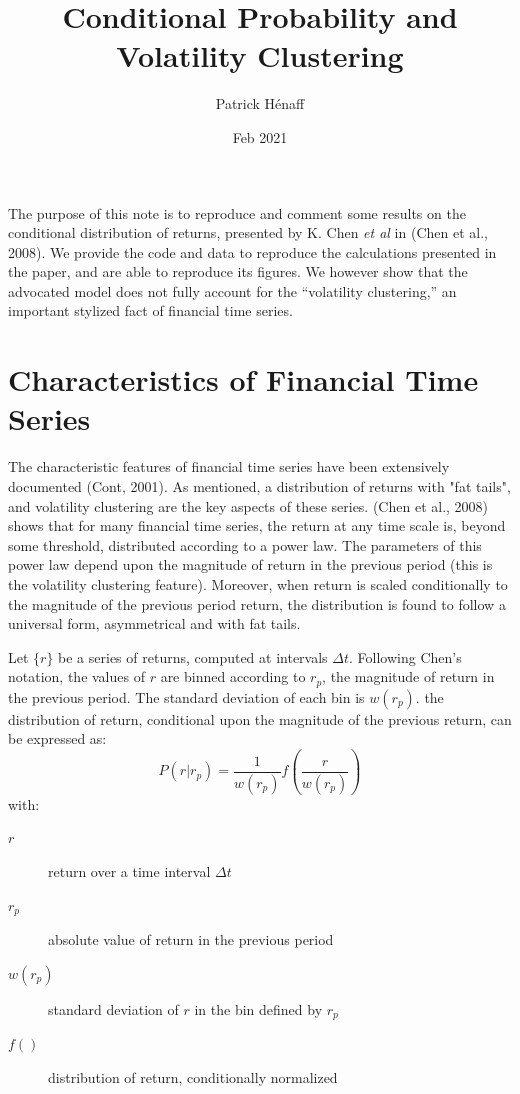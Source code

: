 \documentclass[
  11pt,
]{article}
\title{Conditional Probability and Volatility Clustering}
\author{Patrick Hénaff}
\date{Feb 2021}
\begin{document}
\maketitle

The purpose of this note is to reproduce and comment some results on the conditional distribution of returns, presented by K. Chen \emph{et al} in (Chen et al., 2008). We provide the code and data to reproduce the calculations presented in the paper, and are able to reproduce its figures. We however show that the advocated model does not fully account for the ``volatility clustering,'' an important stylized fact of financial time series.

\hypertarget{sec:fts}{%
\section{Characteristics of Financial Time Series}\label{sec:fts}}

The characteristic features of financial time series have been
extensively documented (Cont, 2001). As mentioned, a distribution of
returns with "fat tails", and volatility clustering are the key
aspects of these series. (Chen et al., 2008) shows that for many financial time
series, the return at any time scale is, beyond some threshold,
distributed according to a power law. The parameters of this power law
depend upon the magnitude of return in the previous period (this is the
volatility clustering feature). Moreover, when return is scaled
conditionally to the magnitude of the previous period return, the
distribution is found to follow a universal form, asymmetrical and with
fat tails.

Let \(\{r\}\) be a series of returns, computed at intervals \(\Delta t\).
Following Chen's notation, the values of \(r\) are binned according to
\(r_p\), the magnitude of return in the previous period. The standard
deviation of each bin is \(w(r_p)\). the distribution of return,
conditional upon the magnitude of the previous return, can be expressed
as:
\begin{equation}
P(r | r_p) = \frac{1}{w(r_p)} f \left( \frac{r}{w(r_p)} \right)
\label{eq:cond-dist}
\end{equation}
with:

\begin{description}
\item[\(r\)]
return over a time interval \(\Delta t\)
\item[\(r_p\)]
absolute value of return in the previous period
\item[\(w(r_p)\)]
standard deviation of \(r\) in the bin defined by \(r_p\)
\item[\(f()\)]
distribution of return, conditionally normalized
\end{description}
\end{document}
